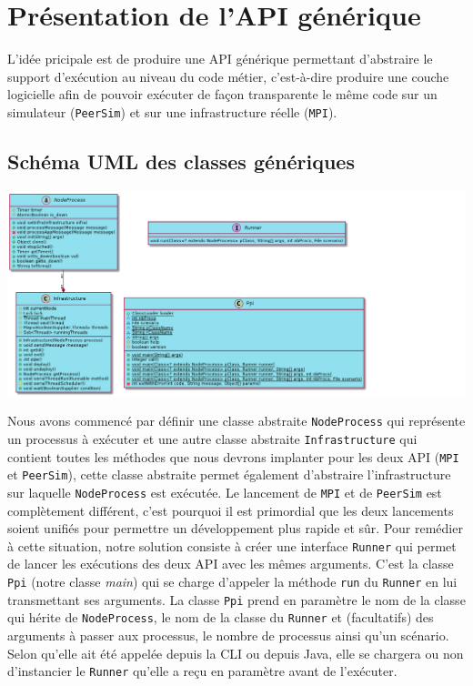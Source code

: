 \documentclass{article}
\begin{document}
			
				\section{Présentation de l'API générique}
				L'idée pricipale est de produire une API générique permettant d'abstraire le support d'exécution au niveau du code métier, c'est-à-dire produire une couche logicielle afin de pouvoir exécuter de façon transparente le même code sur un simulateur (\verb|PeerSim|) et sur une infrastructure réelle (\verb|MPI|).					
				\subsection{Schéma UML des classes génériques}
					\vspace{2mm}
					\hspace*{-1cm} \includegraphics[width=22cm]{uml/generique.png}
					
					\vspace{8mm}
					Nous avons commencé par définir une classe abstraite \verb|NodeProcess| qui représente un processus à exécuter et une autre classe abstraite \verb|Infrastructure| qui contient toutes les méthodes que nous devrons implanter pour les deux API (\verb|MPI| et \verb|PeerSim|), cette classe abstraite permet également d'abstraire l'infrastructure sur laquelle \verb|NodeProcess| est exécutée.
					\newline
					\newline
					Le lancement de \verb|MPI| et de \verb|PeerSim| est complètement différent, c’est pourquoi il est primordial que les deux lancements soient unifiés pour permettre un développement plus rapide et sûr. 
					\newline
					Pour remédier à cette situation, notre solution consiste à créer une interface \verb|Runner| qui permet de lancer les exécutions des deux API avec les mêmes arguments. C'est la classe \verb|Ppi|
					(notre classe \emph{main}) qui se charge d'appeler la méthode \verb|run| du
					\verb|Runner| en lui transmettant ses arguments. La classe \verb|Ppi| prend en
					paramètre le nom de la classe qui hérite de \verb|NodeProcess|, le nom de la classe
					du \verb|Runner| et (facultatifs) des arguments à passer aux processus,
					le nombre de processus ainsi qu’un scénario.
					Selon qu'elle ait été appelée depuis la CLI ou depuis Java, elle se chargera ou
					non d'instancier le \verb|Runner| qu'elle a reçu en paramètre avant de l'exécuter.
		
\end{document}

